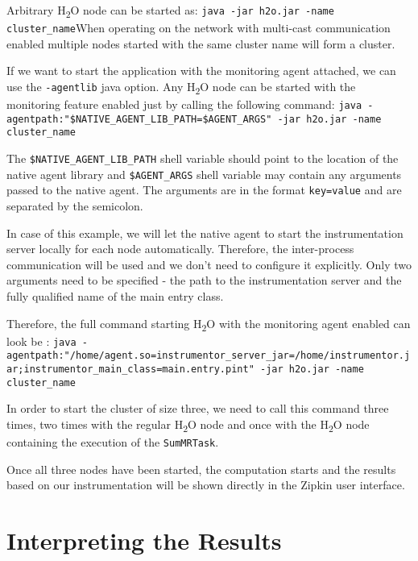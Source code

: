 Arbitrary H\textsubscript{2}O node can be started as: \newline \texttt{java -jar h2o.jar -name cluster\_name}\newline When operating on the network with multi-cast communication enabled multiple nodes started with the same cluster name will form a cluster.

If we want to start the application with the monitoring agent attached, we can use the \texttt{-agentlib} java option. Any H\textsubscript{2}O node can be started with the monitoring feature enabled just by calling the following command: \newline
\texttt{java -agentpath:"\$NATIVE\_AGENT\_LIB\_PATH=\$AGENT\_ARGS" -jar h2o.jar  \newline -name cluster\_name}

The \texttt{\$NATIVE\_AGENT\_LIB\_PATH} shell variable should point to the location of the native agent library and \texttt{\$AGENT\_ARGS} shell variable may contain any arguments passed to the native agent. The arguments are in the format \texttt{key=value} and are separated by the semicolon.

In case of this example, we will let the native agent to start the instrumentation server locally for each node automatically. Therefore, the inter-process communication will be used and we don't need to configure it explicitly. Only two arguments need to be specified - the path to the instrumentation server and the fully qualified name of the main entry class.

Therefore, the full command starting H\textsubscript{2}O with the monitoring agent enabled can look be : \newline
\texttt{java -agentpath:"/home/agent.so=instrumentor\_server\_jar=\newline/home/instrumentor.jar;instrumentor\_main\_class=main.entry.pint" \newline-jar h2o.jar -name cluster\_name}

In order to start the cluster of size three, we need to call this command three times, two times with the regular H\textsubscript{2}O node and once with the H\textsubscript{2}O node containing the execution of the \texttt{SumMRTask}.

Once all three nodes have been started, the computation starts and the results based on our instrumentation will be shown directly in the Zipkin user interface.
\section{Interpreting the Results}
